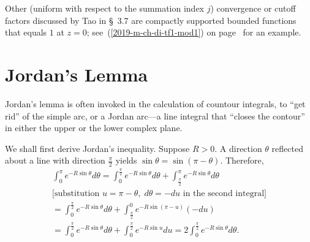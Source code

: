 Other (uniform with respect to the summation index $j$)
convergence or cutoff factors discussed by Tao\cite{Tao-2013}  in \S~3.7 are
compactly supported bounded functions that equals $1$ at $z=0$;
see~(\ref{2019-m-ch-di-tf1-mod1}) on page~\pageref{2019-m-ch-di-tf1-mod1}
for an example.


\section{Jordan's Lemma}
\label{2021-mm-ch-ca-jl}
Jordan's lemma is often invoked in the calculation of countour integrals, to ``get rid'' of the
simple arc, or a Jordan arc---a line integral that
``closes the  contour'' in either the upper or the lower complex plane.

We shall first derive Jordan's inequality.
Suppose $R>0$.
A  direction $\theta$   reflected about a line with direction  $\frac{\pi}{2}$
yields $ \sin  \theta  =  \sin \left( \pi - \theta \right)$.
Therefore,
\begin{equation}
\begin{split}
\label{2021-mm-ch-ca-ji}
\int_0^\pi e^{-R \sin \theta} d\theta
=
\int_0^\frac{\pi}{2} e^{-R \sin \theta} d\theta
+
\int_\frac{\pi}{2}^\pi e^{-R \sin \theta} d\theta
\\
\text{[substitution } u= \pi -\theta,\; d\theta = -du \text{ in the second integral]}
\\
= \int_0^\frac{\pi}{2} e^{-R \sin \theta} d\theta
+
\int_\frac{\pi}{2}^0  e^{-R \sin \left( \pi -u\right) } \left(-du\right)
\\
= \int_0^\frac{\pi}{2} e^{-R \sin \theta} d\theta
+
\int_0^\frac{\pi}{2}  e^{-R \sin u } du
= 2 \int_0^\frac{\pi}{2} e^{-R \sin \theta} d\theta
.
\end{split}
\end{equation}


